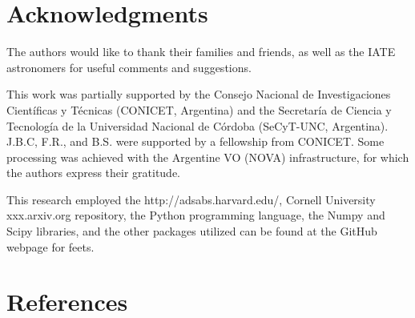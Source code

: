 \documentclass[final,5p,times,twocolumn,authoryear]{elsarticle}
\begin{document}
\section{Acknowledgments}
The authors would like to thank their families and friends, as well as the IATE
astronomers for useful comments and suggestions.

This work was partially supported by the Consejo Nacional
de Investigaciones Cient\'ificas y T\'ecnicas (CONICET, Argentina)
and the Secretaría de Ciencia y Tecnolog\'ia de la Universidad
Nacional de C\'ordoba (SeCyT-UNC, Argentina).
J.B.C, F.R., and B.S. were supported by a fellowship from CONICET.
Some processing was achieved with the Argentine VO (NOVA) infrastructure,
for which the authors express their gratitude.

This research employed the
http://adsabs.harvard.edu/, Cornell University xxx.arxiv.org repository,
the Python programming language, the Numpy and Scipy libraries,
and the other packages utilized can be found at the 
GitHub webpage for feets.

%
\section*{References}
\label{biblio}


\end{document}
